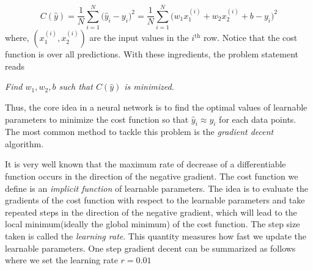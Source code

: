 \documentclass[12pt]{article}
\begin{document}
%
%

\begin{equation}
\label{eq:cost}
C(\hat{y})=\dfrac{1}{N}\sum_{i=1}^{N}\Big(\hat{y}_i -y_i\Big)^2 =
 \dfrac{1}{N}\sum_{i=1}^{N}\Big(w_{1}x_{1}^{(i)}+w_{2}x_{2}^{(i)}+b -y_i\Big)^2
\end{equation}
\noindent where, $\left(x_1^{(i)},x_2^{(i)}\right)$ are the input values in the $i^{\text{th}}$ row. Notice that the cost function is over all predictions. With these ingredients, the problem statement reads 
\begin{center}
\textit{Find $w_1,w_2,b$ such that $C(\hat{y})$ is minimized.}
\end{center} 
Thus, the core idea in a neural network is to find the optimal values of learnable parameters to minimize the cost function so that $\hat{y}_i \approx y_i$ for each data points. The most common method to tackle this problem is the \textit{gradient decent} algorithm.  

It is very well known that the maximum rate of decrease of a differentiable function occurs in the direction of the negative gradient. The cost function we define is an \textit{implicit function} of learnable parameters. 
The idea is to evaluate the gradients of the cost function with respect to the learnable parameters and take repeated steps in the direction of the negative gradient, which will lead to the local minimum(ideally the global minimum) of the cost function. 
The step size taken is called the \textit{learning rate}. This quantity measures how fast we update the learnable parameters. One step gradient decent can be summarized as follows where we set the learning rate $r=0.01$
\end{document}
